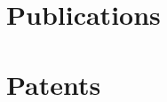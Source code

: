 \documentclass[a4paper,12pt]{article}
\begin{document}


\section{Publications}
\begin{refsection}
\nocite{*}
\printbibliography[heading=none]
\end{refsection}

\section{Patents}
\begin{refsection}
\nocite{*}
\printbibliography[heading=none]
\end{refsection}



\end{document}
